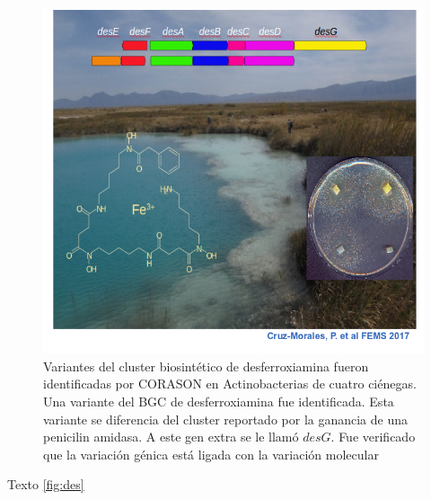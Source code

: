 \documentclass[12pt,twoside]{reedthesis}
\begin{document}
  \begin{figure}[h!tbp]
  \centering
  \includegraphics[angle = 0,scale = .4]{chapter3/des.png}
  \caption[EvoMining Algorithm]{\footnotesize{Variantes del cluster biosintético de desferroxiamina fueron identificadas por CORASON en Actinobacterias de cuatro ciénegas. Una variante del BGC de desferroxiamina fue identificada. Esta variante se diferencia del cluster reportado por la ganancia de una penicilin amidasa. A este gen extra se le llamó $desG$. Fue verificado que la variación génica está ligada con la variación molecular}}
  \label{fig:des}
  \end{figure}
  
  Texto \autoref{fig:des}
  
\end{document}
